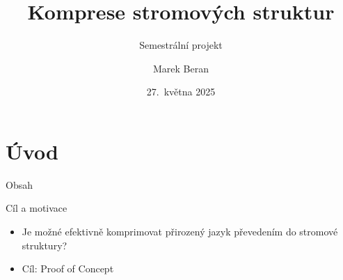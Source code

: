 \documentclass[lualatex,hyperref={pdfencoding=auto}]{beamer}
\title[Komprese stromových struktur]{Komprese stromových struktur}
\subtitle{Semestrální projekt}
\author{Marek Beran}
\institute[VŠB-TUO]{VŠB -- Technická univerzita Ostrava\\\vspace{2mm}marek.beran.st@vsb.cz}
\date[27.~5.~2025]{27.~května 2025}
\begin{document}
\section{Úvod}

\begin{frame}{Obsah}
    \tableofcontents
\end{frame}

\begin{frame}{Cíl a motivace}

\begin{itemize}
    \item Je možné efektivně komprimovat přirozený jazyk převedením do stromové struktury?
    \item Cíl: Proof of Concept
\end{itemize}
\end{frame}
\end{document}
